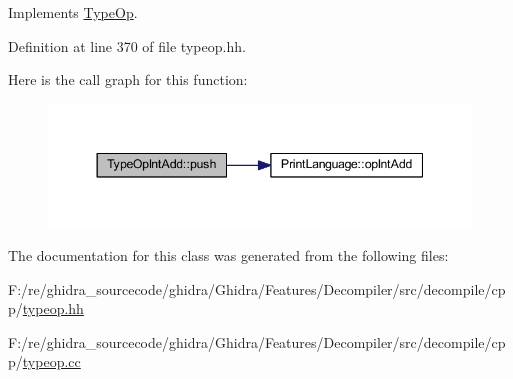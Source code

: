 Implements \mbox{\hyperlink{class_type_op_ac9c9544203ed74dabe6ac662b653b2af}{Type\+Op}}.



Definition at line 370 of file typeop.\+hh.

Here is the call graph for this function\+:
\nopagebreak
\begin{figure}[H]
\begin{center}
\leavevmode
\includegraphics[width=344pt]{class_type_op_int_add_aef08e55caf43842a91d116ba2174091e_cgraph}
\end{center}
\end{figure}


The documentation for this class was generated from the following files\+:\begin{DoxyCompactItemize}
\item 
F\+:/re/ghidra\+\_\+sourcecode/ghidra/\+Ghidra/\+Features/\+Decompiler/src/decompile/cpp/\mbox{\hyperlink{typeop_8hh}{typeop.\+hh}}\item 
F\+:/re/ghidra\+\_\+sourcecode/ghidra/\+Ghidra/\+Features/\+Decompiler/src/decompile/cpp/\mbox{\hyperlink{typeop_8cc}{typeop.\+cc}}\end{DoxyCompactItemize}
